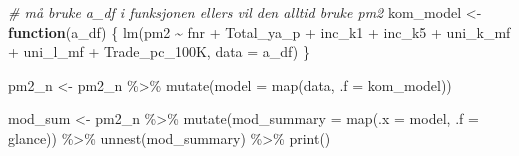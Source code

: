 \documentclass[
]{article}
\newenvironment{Shaded}{\begin{snugshade}}{\end{snugshade}}
\newcommand{\AttributeTok}[1]{\textcolor[rgb]{0.77,0.63,0.00}{#1}}
\newcommand{\CommentTok}[1]{\textcolor[rgb]{0.56,0.35,0.01}{\textit{#1}}}
\newcommand{\ControlFlowTok}[1]{\textcolor[rgb]{0.13,0.29,0.53}{\textbf{#1}}}
\newcommand{\FunctionTok}[1]{\textcolor[rgb]{0.00,0.00,0.00}{#1}}
\newcommand{\NormalTok}[1]{#1}
\newcommand{\OtherTok}[1]{\textcolor[rgb]{0.56,0.35,0.01}{#1}}
\newcommand{\SpecialCharTok}[1]{\textcolor[rgb]{0.00,0.00,0.00}{#1}}
\begin{document}
\begin{Shaded}
\begin{Highlighting}[]
\CommentTok{\# må bruke a\_df i funksjonen ellers vil den alltid bruke pm2}
\NormalTok{kom\_model }\OtherTok{\textless{}{-}} \ControlFlowTok{function}\NormalTok{(a\_df) \{}
   \FunctionTok{lm}\NormalTok{(pm2 }\SpecialCharTok{\textasciitilde{}}\NormalTok{ fnr }\SpecialCharTok{+}\NormalTok{ Total\_ya\_p }\SpecialCharTok{+}\NormalTok{ inc\_k1 }\SpecialCharTok{+}\NormalTok{ inc\_k5 }\SpecialCharTok{+}\NormalTok{ uni\_k\_mf }\SpecialCharTok{+}\NormalTok{ uni\_l\_mf }\SpecialCharTok{+}\NormalTok{ Trade\_pc\_100K, }\AttributeTok{data =}\NormalTok{ a\_df)}
\NormalTok{\}}
\end{Highlighting}
\end{Shaded}

\begin{Shaded}
\begin{Highlighting}[]
\NormalTok{pm2\_n }\OtherTok{\textless{}{-}}\NormalTok{ pm2\_n }\SpecialCharTok{\%\textgreater{}\%} 
   \FunctionTok{mutate}\NormalTok{(}\AttributeTok{model =} \FunctionTok{map}\NormalTok{(data, }\AttributeTok{.f =}\NormalTok{ kom\_model)) }
\end{Highlighting}
\end{Shaded}

\begin{Shaded}
\end{Shaded}

\begin{Shaded}
\begin{Highlighting}[]
\NormalTok{mod\_sum }\OtherTok{\textless{}{-}}\NormalTok{ pm2\_n }\SpecialCharTok{\%\textgreater{}\%} 
   \FunctionTok{mutate}\NormalTok{(}\AttributeTok{mod\_summary =} \FunctionTok{map}\NormalTok{(}\AttributeTok{.x =}\NormalTok{ model, }\AttributeTok{.f =}\NormalTok{ glance)) }\SpecialCharTok{\%\textgreater{}\%} 
   \FunctionTok{unnest}\NormalTok{(mod\_summary) }\SpecialCharTok{\%\textgreater{}\%} 
   \FunctionTok{print}\NormalTok{()}
\end{Highlighting}
\end{Shaded}
\end{document}
